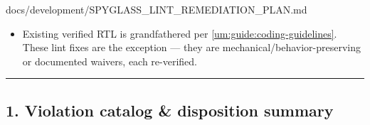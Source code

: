 \begin{relocated}{docs/development/SPYGLASS_LINT_REMEDIATION_PLAN.md}
\begin{itemize}
  \begin{itemize}
  \tightlist
  \item
    \textbf{Design-intent violations → WAIVE + DOCUMENT} (do not rewrite
    verified RTL for style). In particular the CPU pipeline stays
    \textbf{synchronous-reset} --- converting to async reset is
    explicitly out of scope (it would require whole-CPU re-verification
    + ASAP7 PPA re-sign-off; tracked as the existing P3 audit item in
    \cref{um:guide:coding-guidelines} §1.4).
  \item
    \textbf{Non-synthesizable
    /\texttt{\$fatal}/\texttt{\$readmemh} → GUARD WITH
    PRAGMAS} (\texttt{`ifndef\ SYNTHESIS}), keeping them for simulation
    while hiding them from lint/\allowbreak{}synth.
  \end{itemize}
\item
  Existing verified RTL is grandfathered per
  \cref{um:guide:coding-guidelines}. These lint fixes are the exception ---
  they are mechanical/\allowbreak{}behavior-preserving or documented
  waivers, each re-verified.
\end{itemize}

\begin{center}\rule{0.5\linewidth}{0.5pt}\end{center}

\subsection{1. Violation catalog \& disposition summary}\label{um:guide:spyglass-lint-remediation:1-violation-catalog-disposition-summary}

{\footnotesize\setlength{\tabcolsep}{3pt}

}
\end{relocated}
